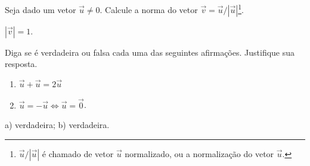 \begin{exer}
  Seja dado um vetor $\vec{u}\neq 0$. Calcule a norma do vetor $\vec{v}=\vec{u}/|\vec{u}|$\footnote{$\vec{u}/|\vec{u}|$ é chamado de vetor $\vec{u}$ normalizado, ou a normalização do vetor $\vec{u}$.}.
\end{exer}
\begin{resp}
  $|\vec{v}|=1$.
\end{resp}

\begin{exer}
  Diga se é verdadeira ou falsa cada uma das seguintes afirmações. Justifique sua resposta.
  \begin{enumerate}
  \item $\vec{u}+\vec{u} = 2\vec{u}$
  \item $\vec{u}=-\vec{u} \Leftrightarrow \vec{u} = \vec{0}$.
  \end{enumerate}
\end{exer}
\begin{resp}
  a) verdadeira; b) verdadeira.
\end{resp}
